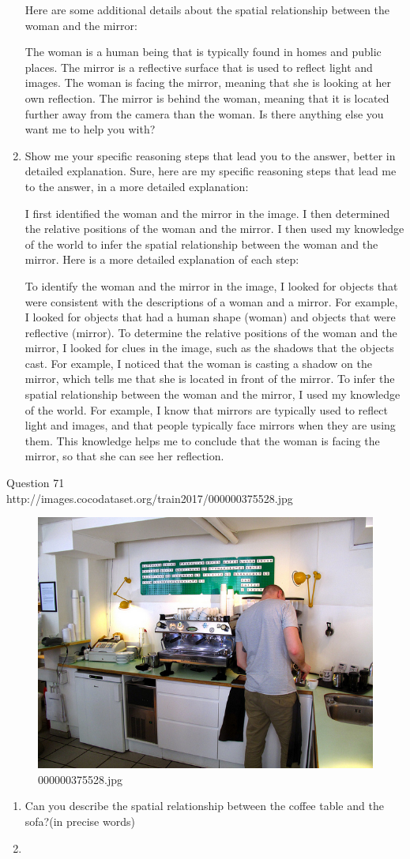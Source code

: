 \begin{enumerate}
    Here are some additional details about the spatial relationship between the woman and the mirror:
    
    The woman is a human being that is typically found in homes and public places.
    The mirror is a reflective surface that is used to reflect light and images.
    The woman is facing the mirror, meaning that she is looking at her own reflection.
    The mirror is behind the woman, meaning that it is located further away from the camera than the woman.
    Is there anything else you want me to help you with?
    \item Show me your specific reasoning steps that lead you to the answer, better in detailed explanation.
    \subitem 
    Sure, here are my specific reasoning steps that lead me to the answer, in a more detailed explanation:
    
    I first identified the woman and the mirror in the image.
    I then determined the relative positions of the woman and the mirror.
    I then used my knowledge of the world to infer the spatial relationship between the woman and the mirror.
    Here is a more detailed explanation of each step:
    
    To identify the woman and the mirror in the image, I looked for objects that were consistent with the descriptions of a woman and a mirror. For example, I looked for objects that had a human shape (woman) and objects that were reflective (mirror).
    To determine the relative positions of the woman and the mirror, I looked for clues in the image, such as the shadows that the objects cast. For example, I noticed that the woman is casting a shadow on the mirror, which tells me that she is located in front of the mirror.
    To infer the spatial relationship between the woman and the mirror, I used my knowledge of the world. For example, I know that mirrors are typically used to reflect light and images, and that people typically face mirrors when they are using them. This knowledge helps me to conclude that the woman is facing the mirror, so that she can see her reflection.
\end{enumerate}
Question 71\\
http://images.cocodataset.org/train2017/000000375528.jpg
\begin{figure}[h]
    \centering
    \includegraphics[width=0.8\linewidth]{../image set/hard/000000375528.jpg}
    \caption{000000375528.jpg}
\end{figure}
\begin{enumerate}
    \item Can you describe the spatial relationship between the coffee table and the sofa?(in precise words)
    \item 
\end{enumerate}